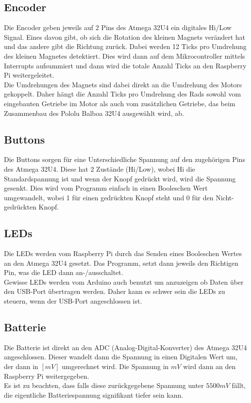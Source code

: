 \documentclass[a4paper, 12pt]{article}
\begin{document}
\subsection*{Encoder}
Die Encoder geben jeweils auf 2 Pins des Atmega 32U4 ein digitales Hi/Low Signal. Eines davon gibt, ob sich die Rotation des kleinen Magnets verändert hat und das andere gibt die Richtung zurück. Dabei werden 12 Ticks pro Umdrehung des kleinen Magnetes detektiert. Dies wird dann auf dem Mikrocontroller mittels Interrupts aufsummiert und dann wird die totale Anzahl Ticks an den Raspberry Pi weitergeleitet.\\
Die Umdrehungen des Magnets sind dabei direkt an die Umdrehung des Motors gekoppelt. Daher hängt die Anzahl Ticks pro Umdrehung des Rads sowohl vom eingebauten Getriebe im Motor als auch vom zusätzlichen Getriebe, das beim Zusammenbau des Pololu Balboa 32U4 ausgewählt wird, ab.

\subsection*{Buttons}
Die Buttons sorgen für eine Unterschiedliche Spannung auf den zugehörigen Pins des Atmega 32U4. Diese hat 2 Zustände (Hi/Low), wobei Hi die Standardspannung ist und wenn der Knopf gedrückt wird, wird die Spannung gesenkt. Dies wird vom Programm einfach in einen Booleschen Wert umgewandelt, wobei 1 für einen gedrückten Knopf steht und 0 für den Nicht-gedrückten Knopf.

\subsection*{LEDs}
Die LEDs werden vom Raspberry Pi durch das Senden eines Booleschen Wertes an den Atmega 32U4 gesetzt. Das Programm, setzt dann jeweils den Richtigen Pin, was die LED dann an-/ausschaltet.\\
Gewisse LEDs werden vom Arduino auch benutzt um anzuzeigen ob Daten über den USB-Port übertragen werden. Daher kann es schwer sein die LEDs zu steuern, wenn der USB-Port angeschlossen ist.

\subsection*{Batterie}
Die Batterie ist direkt an den ADC (Analog-Digital-Konverter) des Atmega 32U4 angeschlossen. Dieser wandelt dann die Spannung in einen Digitalen Wert um, der dann in $[mV]$ umgerechnet wird. Die Spannung in $mV$ wird dann an den Raspberry Pi weitergegeben.\\
Es ist zu beachten, dass falls diese zurückgegebene Spannung unter $5500 mV$ fällt, die eigentliche Batteriespannung signifikant tiefer sein kann.
\end{document}
